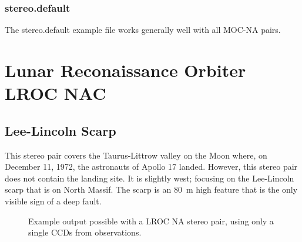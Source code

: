 \subsubsection*{stereo.default}

The stereo.default example file works generally well with all MOC-NA pairs.

\section{Lunar Reconaissance Orbiter LROC NAC}

\subsection{Lee-Lincoln Scarp}

This stereo pair covers the Taurus-Littrow valley on the Moon where,
on December 11, 1972, the astronauts of Apollo 17 landed. However,
this stereo pair does not contain the landing site.  It is slightly
west; focusing on the Lee-Lincoln scarp that is on North Massif. The
scarp is an 80~m high feature that is the only visible sign of a deep
fault.

\begin{figure}[h!]
\centering
  \hfil
\caption{Example output possible with a LROC NA stereo pair, using only a single CCDs from observations.}
\label{fig:lroc-na-example}
\end{figure}

